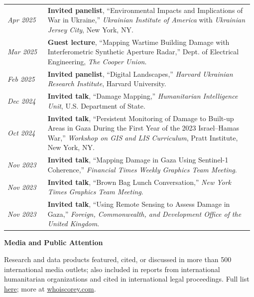 \documentclass[letterpaper,11pt,oneside]{article}
\newcommand{\datefmt}[1]{\textit{#1}}
\begin{document}
\begin{longtable}{@{}p{0.16\linewidth}p{0.82\linewidth}@{}}
\datefmt{Apr 2025} & \textbf{Invited panelist}, “Environmental Impacts and Implications of War in Ukraine,” \textit{Ukrainian Institute of America} with \textit{Ukrainian Jersey City}, New York, NY.\\[1.0ex]

\datefmt{Mar 2025} & \textbf{Guest lecture}, “Mapping Wartime Building Damage with Interferometric Synthetic Aperture Radar,” Dept. of Electrical Engineering, \textit{The Cooper Union}.\\[1.0ex]

\datefmt{Feb 2025} & \textbf{Invited panelist}, “Digital Landscapes,” \textit{Harvard Ukrainian Research Institute}, Harvard University.\\[1.0ex]

\datefmt{Dec 2024} & \textbf{Invited talk}, “Damage Mapping,” \textit{Humanitarian Intelligence Unit}, U.S. Department of State.\\[1.0ex]

\datefmt{Oct 2024} & \textbf{Invited talk}, “Persistent Monitoring of Damage to Built-up Areas in Gaza During the First Year of the 2023 Israel–Hamas War,” \textit{Workshop on GIS and LIS Curriculum}, Pratt Institute, New York, NY.\\[1.0ex]

\datefmt{Nov 2023} & \textbf{Invited talk}, “Mapping Damage in Gaza Using Sentinel-1 Coherence,” \textit{Financial Times Weekly Graphics Team Meeting}.\\[1.0ex]

\datefmt{Nov 2023} & \textbf{Invited talk}, “Brown Bag Lunch Conversation,” \textit{New York Times Graphics Team Meeting}.\\[1.0ex]

\datefmt{Nov 2023} & \textbf{Invited talk}, “Using Remote Sensing to Assess Damage in Gaza,” \textit{Foreign, Commonwealth, and Development Office of the United Kingdom}.\\[1.0ex]

\end{longtable}
\vspace{-4ex}
\begin{flushleft}\textbf{\Large{Media and Public Attention}}\end{flushleft}
\vspace{-1ex}
\noindent Research and data products featured, cited, or discussed in more than 500 international media outlets; also included in reports from international humanitarian organizations and cited in international legal proceedings. Full list \href{https://docs.google.com/spreadsheets/d/1_XVQx97hH3n31XPoYimmIstnZUhof8a5Z5rt3Z2VZg4/edit#gid=522618229}{here}; more at \href{https://whoiscorey.com}{whoiscorey.com}.\\[1ex]
\vspace{-4ex}
\end{document}
